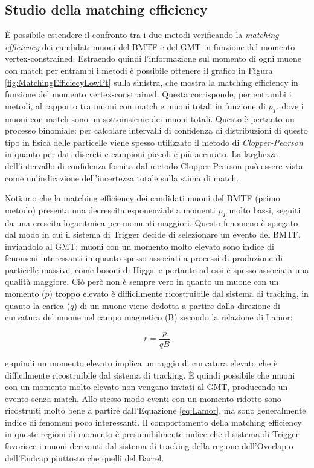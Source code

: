 \subsection{Studio della matching efficiency}
\label{sec:MatchingEfficiency}

È possibile estendere il confronto tra i due metodi verificando la \textit{matching efficiency} dei candidati muoni del BMTF e del GMT in funzione del momento vertex-constrained. Estraendo quindi l'informazione sul momento di ogni muone con match per entrambi i metodi è possibile ottenere il grafico in Figura \ref{fig:MatchingEfficiecyLowPt} sulla sinistra, che mostra la matching efficiency in funzione del momento vertex-constrained. 
Questa corrisponde, per entrambi i metodi, al rapporto tra muoni con match e muoni totali in funzione di $p_T$, dove i muoni con match sono un sottoinsieme dei muoni totali. Questo è pertanto un processo binomiale: per calcolare intervalli di confidenza di distribuzioni di questo tipo in fisica delle particelle viene spesso utilizzato il metodo di \textit{Clopper-Pearson} in quanto per dati discreti e campioni piccoli è più accurato. La larghezza dell’intervallo di confidenza fornita dal metodo Clopper-Pearson può essere vista come un’indicazione dell’incertezza totale sulla stima di match.


Notiamo che la matching efficiency dei candidati muoni del BMTF (primo metodo) presenta una decrescita esponenziale a momenti $p_T$ molto bassi, seguiti da una crescita logaritmica per momenti maggiori. Questo fenomeno è spiegato dal modo in cui il sistema di Trigger decide di selezionare un evento del BMTF, inviandolo al GMT: muoni con un momento molto elevato sono indice di fenomeni interessanti in quanto spesso associati a processi di produzione di particelle massive, come bosoni di Higgs, e pertanto ad essi è spesso associata una qualità maggiore. Ciò però non è sempre vero in quanto un muone con un momento ($p$) troppo elevato è difficilmente ricostruibile dal sistema di tracking, in quanto la carica ($q$) di un muone viene dedotta a partire dalla direzione di curvatura del muone nel campo magnetico (B) secondo la relazione di Lamor:

\begin{equation}
  \label{eq:Lamor}
  r = \frac{p}{qB}
\end{equation}

e quindi un momento elevato implica un raggio di curvatura elevato che è difficilmente ricostruibile dal sistema di tracking. È quindi possibile che muoni con un momento molto elevato non vengano inviati al GMT, producendo un evento senza match.  
Allo stesso modo eventi con un momento ridotto sono ricostruiti molto bene a partire dall'Equazione \ref{eq:Lamor}, ma sono generalmente indice di fenomeni poco interessanti. Il comportamento della matching efficiency in queste regioni di momento è presumibilmente indice che il sistema di Trigger favorisce i muoni derivanti dal sistema di tracking della regione dell'Overlap o dell'Endcap piuttosto che quelli del Barrel.

